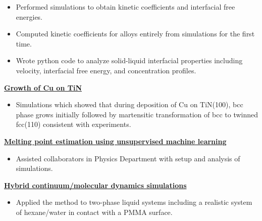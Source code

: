 \begin{cventries}
{\begin{cvitems}
\begin{itemize}
                    \item {Performed simulations to obtain kinetic coefficients and interfacial free energies.}
                    \item {Computed kinetic coefficients for alloys entirely from simulations for the first time.}
                    \item {Wrote python code to analyze solid-liquid interfacial properties including velocity, interfacial free energy, and concentration profiles.}
                \end{itemize}
            \item {\textbf{\underline{Growth of Cu on TiN}}}
                \vspace{2pt}
                \begin{itemize}
                \item {Simulations which showed that during deposition of Cu on TiN(100), bcc phase grows initially followed by martensitic transformation of bcc to twinned fcc(110) consistent with experiments.}
                \end{itemize}
            \item {\textbf{\underline{Melting point estimation using unsupervised machine learning}}}
                \vspace{2pt}
                \begin{itemize}
                \item {Assisted collaborators in Physics Department with setup and analysis of simulations.}
                \end{itemize}
            \item {\textbf{\underline{Hybrid continuum/molecular dynamics simulations}}}
                \vspace{2pt}
                \begin{itemize}
                \item {Applied the method to two-phase liquid systems including a realistic system of hexane/water in contact with a PMMA surface.}
                \end{itemize}
        \end{cvitems}
    }


\end{cventries}

